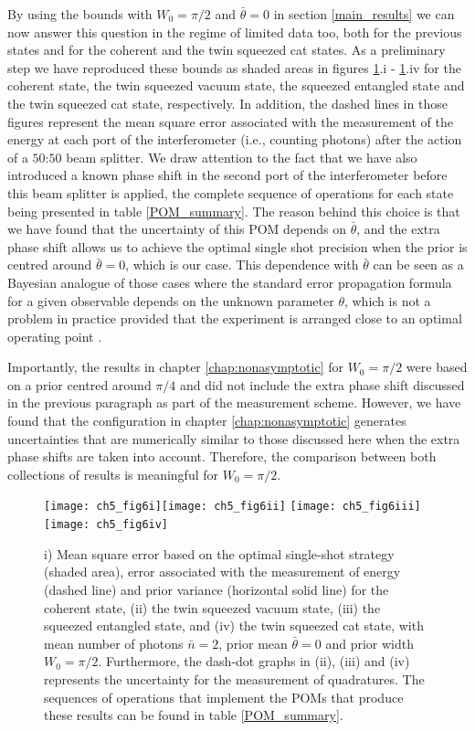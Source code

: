 By using the bounds with $W_0=\pi/2$ and $\bar{\theta} = 0$ in section \ref{main_results} we can now answer this question in the regime of limited data too, both for the previous states and for the coherent and the twin squeezed cat states. As a preliminary step we have reproduced these bounds as shaded areas in figures \ref{continuousPOM}.i - \ref{continuousPOM}.iv for the coherent state, the twin squeezed vacuum state, the squeezed entangled state and the twin squeezed cat state, respectively. In addition, the dashed lines in those figures represent the mean square error associated with the measurement of the energy at each port of the interferometer (i.e., counting photons) after the action of a $50$:$50$ beam splitter. We draw attention to the fact that we have also introduced a known phase shift in the second port of the interferometer before this beam splitter is applied, the complete sequence of operations for each state being presented in table \ref{POM_summary}. The reason behind this choice is that we have found that the uncertainty of this POM depends on $\bar{\theta}$, and the extra phase shift allows us to achieve the optimal single shot precision when the prior is centred around $\bar{\theta} = 0$, which is our case. This dependence with $\bar{\theta}$ can be seen as a Bayesian analogue of those cases where the standard error propagation formula for a given observable depends on the unknown parameter $\theta$, which is not a problem in practice provided that the experiment is arranged close to an optimal operating point \cite{rafal2015}.

Importantly, the results in chapter \ref{chap:nonasymptotic} for $W_0=\pi/2$ were based on a prior centred around $\pi/4$ and did not include the extra phase shift discussed in the previous paragraph as part of the measurement scheme. However, we have found that the configuration in chapter \ref{chap:nonasymptotic} generates uncertainties that are numerically similar to those discussed here when the extra phase shifts are taken into account. Therefore, the comparison between both collections of results is meaningful for $W_0=\pi/2$.

\begin{figure}[t]
\centering
\texttt{[image: ch5\_fig6i]}\texttt{[image: ch5\_fig6ii]}
\texttt{[image: ch5\_fig6iii]}\texttt{[image: ch5\_fig6iv]}
	\caption[Performance of schemes with practical states and POMs]{i) Mean square error based on the optimal single-shot strategy (shaded area), error associated with the measurement of energy (dashed line) and prior variance (horizontal solid line) for the coherent state, (ii) the twin squeezed vacuum state, (iii) the squeezed entangled state, and (iv) the twin squeezed cat state, with mean number of photons $\bar{n}=2$, prior mean $\bar{\theta} = 0$ and prior width $W_0 = \pi/2$. Furthermore, the dash-dot graphs in (ii), (iii) and (iv) represents the uncertainty for the measurement of quadratures. The sequences of operations that implement the POMs that produce these results can be found in table \ref{POM_summary}.}
\label{continuousPOM}
\end{figure}

